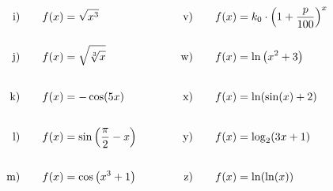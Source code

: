 \begin{exercise}
\begin{alignat*}{5}
        \text{i)\vstrut}&\quad & \xci & \quad&\quad & \text{v)\vstrut}&\quad & \xcv \\
        \text{j)\vstrut}&\quad & \xcj & \quad&\quad & \text{w)\vstrut}&\quad & \xcw \\
        \text{k)\vstrut}&\quad & \xck & \quad&\quad & \text{x)\vstrut}&\quad & \xcx \\
        \text{l)\vstrut}&\quad & \xcl & \quad&\quad & \text{y)\vstrut}&\quad & \xcy \\
        \text{m)\vstrut}&\quad & \xcm & \quad&\quad & \text{z)\vstrut}&\quad & \xcz
      \end{alignat*}
    \endgroup
  \fi
\end{exercise}
